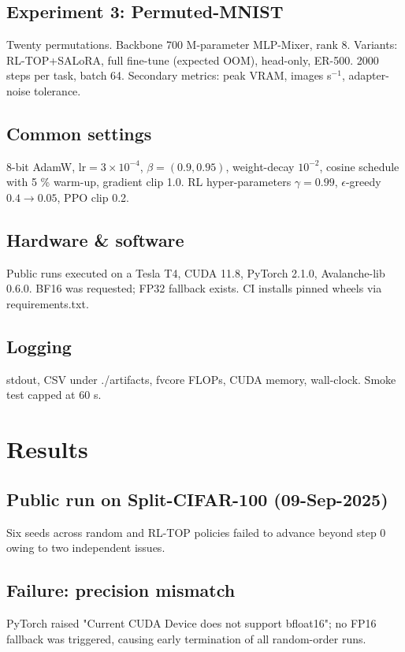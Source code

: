 \documentclass{article}
\begin{document}
\subsection{Experiment 3: Permuted-MNIST}
Twenty permutations. Backbone 700 M-parameter MLP-Mixer, rank 8. Variants: RL-TOP+SALoRA, full fine-tune (expected OOM), head-only, ER-500. 2000 steps per task, batch 64. Secondary metrics: peak VRAM, images s$^{-1}$, adapter-noise tolerance.

\subsection{Common settings}
8-bit AdamW, $\text{lr} = 3 \times 10^{-4}$, $\beta = (0.9, 0.95)$, weight-decay $10^{-2}$, cosine schedule with 5 \% warm-up, gradient clip 1.0. RL hyper-parameters $\gamma = 0.99$, $\epsilon$-greedy $0.4 \rightarrow 0.05$, PPO clip 0.2.

\subsection{Hardware \& software}
Public runs executed on a Tesla T4, CUDA 11.8, PyTorch 2.1.0, Avalanche-lib 0.6.0. BF16 was requested; FP32 fallback exists. CI installs pinned wheels via requirements.txt.

\subsection{Logging}
stdout, CSV under ./artifacts, fvcore FLOPs, CUDA memory, wall-clock. Smoke test capped at 60 s.

\section{Results}
\subsection{Public run on Split-CIFAR-100 (09-Sep-2025)}
Six seeds across random and RL-TOP policies failed to advance beyond step 0 owing to two independent issues.

\subsection{Failure: precision mismatch}
PyTorch raised "Current CUDA Device does not support bfloat16"; no FP16 fallback was triggered, causing early termination of all random-order runs.
\end{document}
